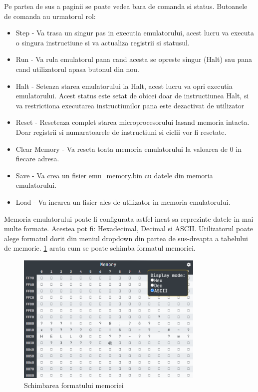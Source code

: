 \documentclass[titlepage,12pt]{article}
\DeclareRobustCommand{\code}[1]{{\ttfamily\small #1}}
\begin{document}
Pe partea de sus a paginii se poate vedea bara de comanda si status. Butoanele de comanda au urmatorul rol:
\begin{itemize}
    \item {\code{Step}} - Va trasa un singur pas in executia emulatorului, acest lucru va executa o singura instructiune si va actualiza registrii si statusul.
    \item {\code{Run}} - Va rula emulatorul pana cand acesta se opreste singur (Halt) sau pana cand utilizatorul apasa butonul din nou.
    \item {\code{Halt}} - Seteaza starea emulatorului la Halt, acest lucru va opri executia emulatorului. Acest status este setat de obicei doar de instructiunea Halt, si va restrictiona executarea instructiunilor pana este dezactivat de utilizator
    \item {\code{Reset}} - Reseteaza complet starea microprocesorului lasand memoria intacta. Doar registrii si numaratoarele de instructiuni si ciclii vor fi resetate.
    \item {\code{Clear Memory}} - Va reseta toata memoria emulatorului la valoarea de 0 in fiecare adresa. 
    \item {\code{Save}} - Va crea un fisier \code{emu\_memory.bin} cu datele din memoria emulatorului.
    \item {\code{Load}} - Va incarca un fisier ales de utilizator in memoria emulatorului.
\end{itemize}

Memoria emulatorului poate fi configurata astfel incat sa reprezinte datele in mai multe formate. Acestea pot fi: Hexadecimal, Decimal si ASCII. Utilizatorul poate alege formatul dorit din meniul dropdown din partea de sus-dreapta a tabelului de memorie. \cref{fig:memoryformat} arata cum se poate schimba formatul memoriei.

\begin{figure}[h!]
    \centering
    \includegraphics[width=0.8\textwidth]{images/memoryformat.png}
    \caption{Schimbarea formatului memoriei}
    \label{fig:memoryformat}
\end{figure}
\end{document}
